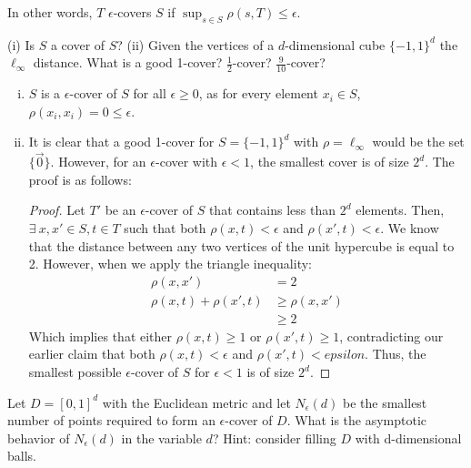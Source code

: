 In other words, $T$ $\epsilon$-covers $S$ if $\sup_{s\in S} 
\rho(s,T)\leq \epsilon$.

\begin{exercise}
(i) Is $S$ a cover of $S$? (ii) Given the vertices of a $d$-dimensional
cube $\{-1,1\}^d$ the $\ell_\infty$ distance. What is a good 1-cover?
$\frac{1}{2}$-cover? $\frac{9}{10}$-cover?
\end{exercise}

\begin{enumerate}[(i)]
	\item $S$ is a $\epsilon$-cover of $S$ for all $\epsilon \geq 0$,
	as for every element $x_i \in S$, $\rho(x_i, x_i) = 0 \leq 
	\epsilon$.
	
	\item It is clear that a good 1-cover for $S = \{-1, 1\}^d$ with 
	$\rho = \ell_\infty$ would be the set $\{\vec{0}\}$. However, for 
	an $\epsilon$-cover with $\epsilon < 1$, the smallest cover is of 
	size $2^d$. The proof is as follows:
	
	\begin{proof}
		Let $T'$ be an $\epsilon$-cover of $S$ that contains less than
		$2^d$ elements. Then, $\exists\ x, x' \in S, t \in T$ such that 
		both $\rho(x, t) < \epsilon$ and $\rho(x', t) < \epsilon$. We 
		know that the distance between any two vertices of the unit 
		hypercube is equal to 2. However, when we apply the triangle
		inequality:
		\begin{align*}
			\rho(x, x') & = 2\\
			\rho(x, t) + \rho(x', t) & \geq \rho(x, x')\\
			& \geq 2
		\end{align*}
		Which implies that either $\rho(x, t) \geq 1$ or $\rho(x', t) 
		\geq 1$, contradicting our earlier claim that both $\rho(x, t) 
		< \epsilon$ and $\rho(x', t) < epsilon$. Thus, the smallest
		possible $\epsilon$-cover of $S$ for $\epsilon < 1$ is of size
		$2^d$.
	\end{proof}
\end{enumerate}

\begin{exercise}
	Let $D=[0,1]^d$ with the Euclidean metric and let $N_\epsilon(d)$ be the smallest number of
	points required to form an $\epsilon$-cover of $D$. What is the asymptotic behavior of $N_\epsilon(d)$ in the variable $d$? 
	Hint: consider filling $D$ with d-dimensional balls.
\end{exercise}
